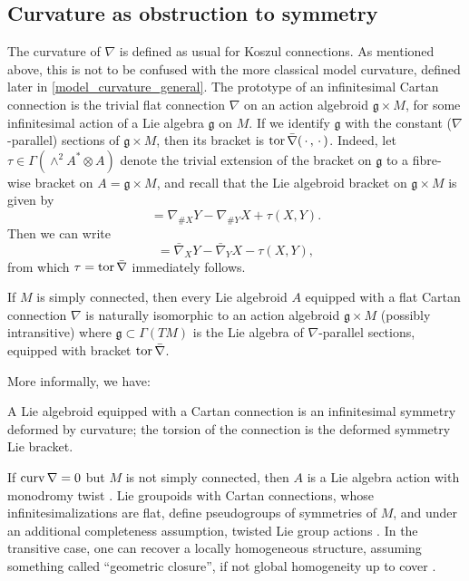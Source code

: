 \documentclass[leqno,12pt]{amsart} %
\begin{document}
\subsection{Curvature as obstruction to symmetry}\label{curvature}
The {\df curvature} of $\nabla $ is defined as usual for Koszul connections. As mentioned
above, this is not to be confused with the more classical {\df model curvature}, defined
later in \ref{model_curvature_general}. The prototype of an infinitesimal Cartan
connection is the trivial flat connection $\nabla $ on an action algebroid
${\mathfrak g} \times M$, for some infinitesimal action of a Lie algebra $\mathfrak g$ on
$M$. If we identify ${\mathfrak g} $ with the constant ($\nabla$-parallel) sections of
${\mathfrak g} \times M$, then its bracket is
$\operatorname{tor}\bar\nabla(\,\cdot\,,\,\cdot\,)$. Indeed, let
$\tau \in \Gamma(\wedge^2 A^* \otimes A)$ denote the trivial extension of the bracket on
${\mathfrak g} $ to a fibre-wise bracket on $A = {\mathfrak g} \times M$, and recall that
the Lie algebroid bracket on ${\mathfrak g} \times M$ is given by
\begin{equation}
  [X,Y]=\nabla_{\#X}Y-\nabla_{\#Y}X +\tau(X,Y). \label{one}
\end{equation}
Then we can write
\begin{equation}
    [X,Y]=\bar\nabla_XY-\bar\nabla_YX - \tau(X,Y),\label{two}
\end{equation}
from which $\tau = \operatorname{tor} \bar\nabla $ immediately follows.

\begin{theorem}
  If $M$ is simply connected, then every Lie algebroid $A$ equipped with a flat Cartan
  connection $\nabla$ is naturally isomorphic to an action algebroid
  ${\mathfrak g} \times M$ (possibly intransitive) where ${\mathfrak g}\subset \Gamma(TM) $
  is the Lie algebra of $\nabla $-parallel sections, equipped with bracket
  $\operatorname{tor} \bar\nabla$.
\end{theorem}
\noindent More informally, we have:
\begin{aside}
  A Lie algebroid equipped with a Cartan connection is an infinitesimal symmetry deformed
  by curvature; the torsion of the connection is the deformed symmetry Lie bracket.
\end{aside}

If $\operatorname{curv} \nabla =0$ but $M $ is not simply connected, then $A$ is a Lie algebra
action with monodromy twist \cite{Blaom_16b}. Lie groupoids with Cartan connections, whose
infinitesimalizations are flat, define pseudogroups of symmetries of $M$, and under an
additional completeness assumption, twisted Lie group actions \cite{Blaom_16,
  Blaom_16b}. In the transitive case, one can recover a locally homogeneous structure,
assuming something called ``geometric closure'', if not global homogeneity up to cover
\cite{Blaom_13}.
\end{document}

